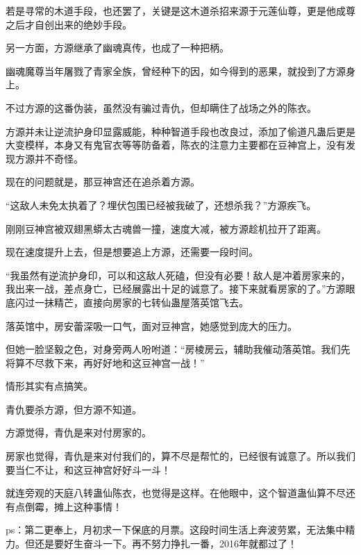 \begin{this_body}
若是寻常的木道手段，也还罢了，关键是这木道杀招来源于元莲仙尊，更是他成尊之后才自创出来的绝妙手段。

另一方面，方源继承了幽魂真传，也成了一种把柄。

幽魂魔尊当年屠戮了青家全族，曾经种下的因，如今得到的恶果，就投到了方源身上。

不过方源的这番伪装，虽然没有骗过青仇，但却瞒住了战场之外的陈衣。

方源并未让逆流护身印显露威能，种种智道手段也改良过，添加了偷道凡蛊后更是大变模样，本身又有鬼官衣等等防备着，陈衣的注意力主要都在豆神宫上，没有发现方源并不奇怪。

现在的问题就是，那豆神宫还在追杀着方源。

“这敌人未免太执着了？埋伏包围已经被我破了，还想杀我？”方源疾飞。

刚刚豆神宫被双翅黑蟒太古魂兽一撞，速度大减，被方源趁机拉开了距离。

现在速度提升上去，但是想要追上方源，还需要一段时间。

“我虽然有逆流护身印，可以和这敌人死磕，但没有必要！敌人是冲着房家来的，我出来一战，差点身亡，已经展露出十足的诚意了。接下来就看房家的了。”方源眼底闪过一抹精芒，直接向房家的七转仙蛊屋落英馆飞去。

落英馆中，房安蕾深吸一口气，面对豆神宫，她感觉到庞大的压力。

但她一脸坚毅之色，对身旁两人吩咐道：“房棱房云，辅助我催动落英馆。我们先将算不尽救下来，再好好地和这豆神宫一战！”

情形其实有点搞笑。

青仇要杀方源，但方源不知道。

方源觉得，青仇是来对付房家的。

房家也觉得，青仇是来对付我们的，算不尽是帮忙的，已经很有诚意了。所以我们要当仁不让，和这豆神宫好好斗一斗！

就连旁观的天庭八转蛊仙陈衣，也觉得是这样。在他眼中，这个智道蛊仙算不尽还有点倒霉，摊上这种事情！

ps：第二更奉上，月初求一下保底的月票。这段时间生活上奔波劳累，无法集中精力。但还是要好生奋斗一下。再不努力挣扎一番，2016年就都过了！

\end{this_body}

